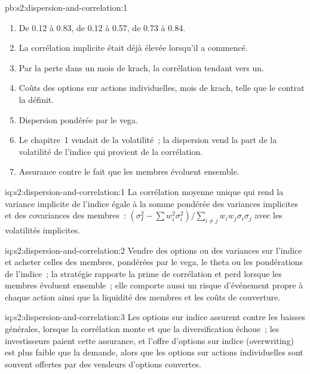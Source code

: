 \begin{solution}{pb:s2:dispersion-and-correlation:1}
\begin{enumerate}
\item De 0.12 à 0.83, de 0.12 à 0.57, de 0.73 à 0.84.
\item La corrélation implicite était déjà élevée lorsqu'il a commencé.
\item Par la perte dans un mois de krach, la corrélation tendant vers un.
\item Coûts des options sur actions individuelles, mois de krach,  telle que le contrat la définit.
\item Dispersion pondérée par le vega.
\item Le chapitre~1 vendait de la volatilité~; la dispersion vend la part de la volatilité de l'indice qui provient de la corrélation.
\item Assurance contre le fait que les membres évoluent ensemble.
\end{enumerate}
\end{solution}

\begin{solution}{iq:s2:dispersion-and-correlation:1}
La corrélation moyenne unique qui rend la variance implicite de l'indice égale à la somme pondérée des variances implicites et des covariances des membres~:
$(\sigma_I^2 - \sum w_i^2\sigma_i^2)/\sum_{i \ne j} w_i w_j\sigma_i\sigma_j$ avec les volatilités implicites.
\end{solution}

\begin{solution}{iq:s2:dispersion-and-correlation:2}
Vendre des options ou des variances sur l'indice et acheter celles des membres, pondérées par le vega, le theta ou les pondérations de l'indice~; la stratégie rapporte la prime de corrélation et
perd lorsque les membres évoluent ensemble~; elle comporte aussi un risque d'événement propre à chaque action ainsi que la liquidité des membres et les coûts de couverture.
\end{solution}

\begin{solution}{iq:s2:dispersion-and-correlation:3}
Les options sur indice assurent contre les baisses générales, lorsque la corrélation monte et que la diversification échoue~; les investisseurs paient cette assurance, et l'offre d'options sur indice
(overwriting) est plus faible que la demande, alors que les options sur actions individuelles sont souvent offertes par des vendeurs d'options couvertes.
\end{solution}

